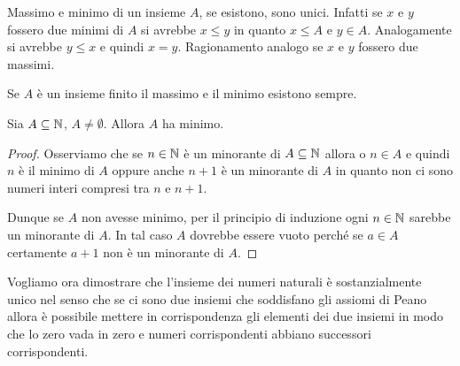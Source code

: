 Massimo e minimo di un insieme $A$, se esistono, sono unici.
Infatti se $x$ e $y$ fossero due minimi di $A$ si avrebbe $x\le y$ in
quanto $x\le A$ e $y\in A$. Analogamente si avrebbe $y\le x$ e
quindi $x=y$. Ragionamento analogo se $x$ e $y$ fossero due massimi.

Se $A$ è un insieme finito il massimo e il minimo 
esistono sempre. 

\begin{theorem}
  \label{th:buon_ordinamento}
  Sia $A\subseteq {\mathbb N}$, $A\neq \emptyset$. 
  Allora $A$ ha minimo.
\end{theorem}
%
\begin{proof}
  Osserviamo che se $n\in {\mathbb N}$ è un minorante di $A\subseteq {\mathbb N}$ 
  allora o $n\in A$ e quindi $n$ è il minimo di $A$
  oppure anche $n+1$ è un minorante di $A$ in quanto 
  non ci sono numeri interi compresi tra $n$ e $n+1$.

  Dunque se $A$ non avesse minimo, per il principio di induzione 
  ogni $n\in{\mathbb N}$ sarebbe un minorante di $A$.
  In tal caso $A$ dovrebbe essere vuoto perché se $a\in A$ 
  certamente $a+1$ non è un minorante di $A$.
\end{proof}

Vogliamo ora dimostrare che l'insieme dei numeri naturali è sostanzialmente 
unico nel senso che se ci sono due insiemi che soddisfano gli assiomi di 
Peano allora è possibile mettere in corrispondenza gli elementi dei due insiemi 
in modo che lo zero vada in zero e numeri corrispondenti abbiano successori 
corrispondenti.

